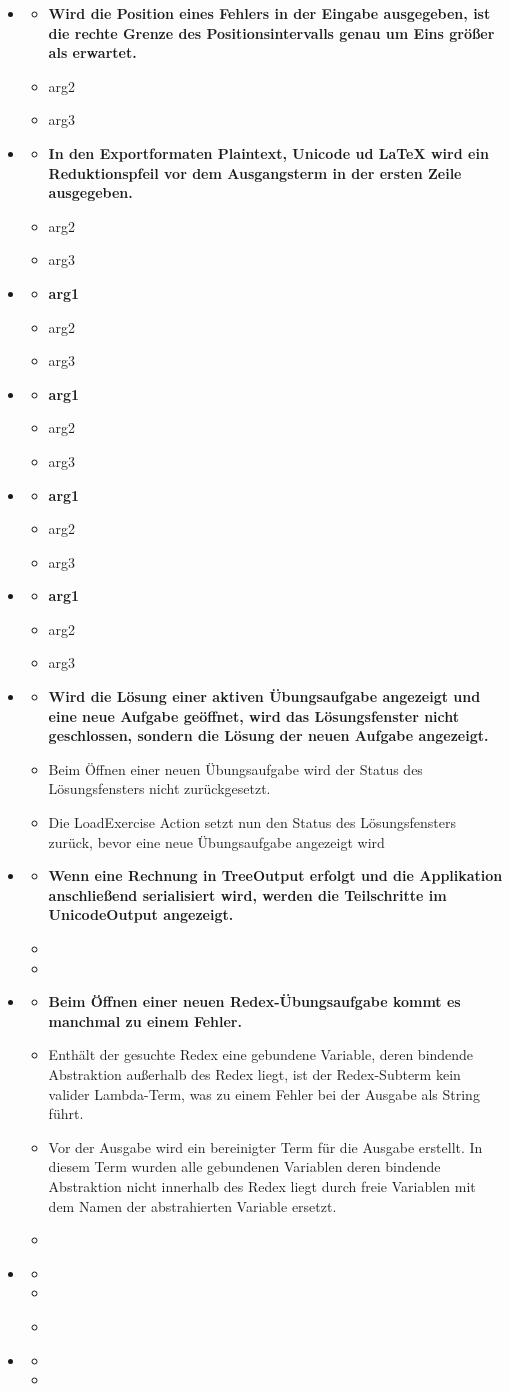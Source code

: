 \documentclass[parskip=full,11pt,openany]{scrreprt}
\begin{document}
\begin{itemize}[itemsep=3ex]

\newcommand{\issue}[3]{%
\item[]
\begin{itemize}[noitemsep]
\item[]\textbf{#1}
\item[\textbf{Grund:}]#2
\item[\textbf{Behebung:}]#3
\end{itemize}}

\issue{Wird die Position eines Fehlers in der Eingabe ausgegeben, ist die rechte Grenze des Positionsintervalls genau um Eins größer als erwartet.}
{arg2}
{arg3}

\issue{In den Exportformaten Plaintext, Unicode ud LaTeX wird ein Reduktionspfeil vor dem Ausgangsterm in der ersten Zeile ausgegeben.}
{arg2}{arg3}

\issue{arg1}
{arg2}
{arg3}

\issue{arg1}
{arg2}
{arg3}

\issue{arg1}{arg2}{arg3}

\issue{arg1}{arg2}{arg3}

\issue{Wird die Lösung einer aktiven Übungsaufgabe angezeigt und eine neue Aufgabe geöffnet, wird das Lösungsfenster nicht geschlossen, sondern die Lösung der neuen Aufgabe angezeigt. }
{Beim Öffnen einer neuen Übungsaufgabe wird der Status des Lösungsfensters nicht zurückgesetzt.}
{Die LoadExercise Action setzt nun den Status des Lösungsfensters zurück, bevor eine neue Übungsaufgabe angezeigt wird}

\issue{Wenn eine Rechnung in TreeOutput erfolgt und die Applikation anschließend serialisiert wird, werden die Teilschritte im UnicodeOutput angezeigt.}
{}
{}

\issue{Beim Öffnen einer neuen Redex-Übungsaufgabe kommt es manchmal zu einem Fehler.}
{Enthält der gesuchte Redex eine gebundene Variable, deren bindende Abstraktion außerhalb des Redex liegt, ist der Redex-Subterm kein valider Lambda-Term, was zu einem Fehler bei der Ausgabe als String führt.}
{Vor der Ausgabe wird ein bereinigter Term für die Ausgabe erstellt. In diesem Term wurden alle gebundenen Variablen deren bindende Abstraktion nicht innerhalb des Redex liegt durch freie Variablen mit dem Namen der abstrahierten Variable ersetzt.}

\issue{}{}{}

\issue{}{}{}


\end{itemize}
\end{document}
